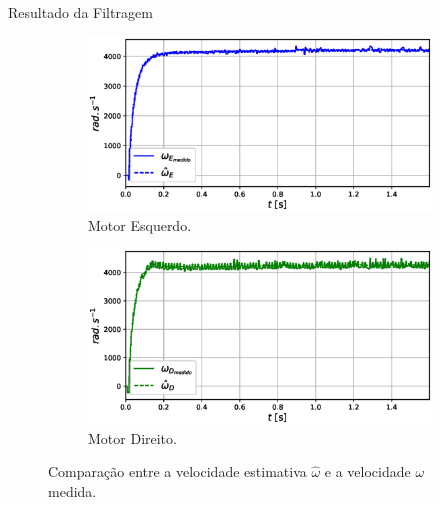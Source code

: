 \begin{frame}{Resultado da Filtragem}

    \begin{figure}
        \begin{subfigure}{.45\textwidth}
            \centering
            \includegraphics[width=\textwidth]{figuras/resultados/exp02/filtro_vs_sem_filtro_esquerdo100.eps}
            \caption{Motor Esquerdo.}
        \end{subfigure}
        \begin{subfigure}{.45\textwidth}
            \centering
            \includegraphics[width=\textwidth]{figuras/resultados/exp02/filtro_vs_sem_filtro_direito100.eps}
            \caption{Motor Direito.}
        \end{subfigure}
        \caption{Comparação entre a velocidade estimativa $\hat{\omega}$ e a velocidade $\omega$ medida.}
    \end{figure}
    
\end{frame}

